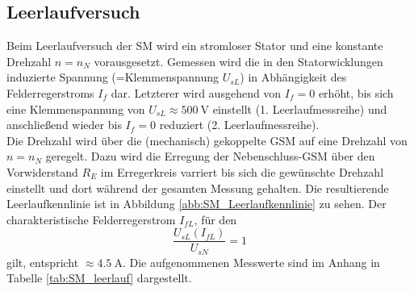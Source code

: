 \subsection{Leerlaufversuch}
Beim Leerlaufversuch der SM wird ein stromloser Stator und eine konstante Drehzahl $n=n_N$ vorausgesetzt. Gemessen wird die in den Statorwicklungen induzierte Spannung (=Klemmenspannung $U_{sL}$) in Abhängigkeit des Felderregerstroms $I_f$ dar. Letzterer wird ausgehend von $I_f=0$ erhöht, bis sich eine Klemmenspannung von $U_{sL}\approx\SI{500}{\volt}$ einstellt (1. Leerlaufmessreihe) und anschließend wieder bis $I_f=0$ reduziert (2. Leerlaufmessreihe).\\
Die Drehzahl wird über die (mechanisch) gekoppelte GSM auf eine Drehzahl von $n=n_N$ geregelt. Dazu wird die Erregung der Nebenschluss-GSM über den Vorwiderstand $R_E$ im Erregerkreis varriert bis sich die gewünschte Drehzahl einstellt und dort während der gesamten Messung gehalten. Die resultierende Leerlaufkennlinie ist in Abbildung \ref{abb:SM_Leerlaufkennlinie} zu sehen. Der charakteristische Felderregerstrom $I_{fL}$, für den
\begin{equation*}
    \frac{U_{sL}(I_{fL})}{U_{sN}} = 1 
\end{equation*}
gilt, entspricht $\approx\SI{4.5}{\ampere}$. Die aufgenommenen Messwerte sind im Anhang in Tabelle \ref{tab:SM_leerlauf} dargestellt.


